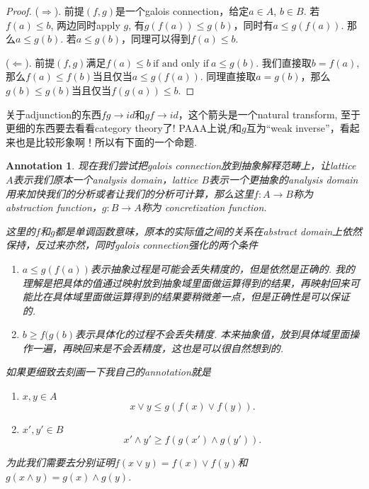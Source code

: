 \documentclass{article}
\newtheorem{annotation}[theorem]{Annotation}
\newcommand*{\xfunc}[4]{{#2}\colon{#3}{#1}{#4}}
\newcommand*{\func}[3]{\xfunc{\to}{#1}{#2}{#3}}
\begin{document}
\begin{center}
\end{center}

\begin{proof}
($\Rightarrow$). 前提$(f,g)$是一个galois connection，给定$a \in A$, $b \in B$. 若$f(a) \leq b$, 两边同时apply $g$, 有$g(f(a)) \leq g(b)$，同时有$a \leq g(f(a))$. 那么$a \leq g(b)$. 若$a \leq g(b)$，同理可以得到$f(a) \leq b$.

($\Leftarrow$). 前提$(f,g)$满足$f(a) \leq b~\text{if and only if}~a \leq g(b)$. 我们直接取$b = f(a)$, 那么$f(a) \leq f(b)$当且仅当$a \leq g(f(a))$. 同理直接取$a = g(b)$，那么$g(b) \leq g(b)$当且仅当$f(g(a)) \leq b $.   
\end{proof}

{\color{blue} 关于adjunction的东西$fg \rightarrow id$和$gf \rightarrow id$，这个箭头是一个natural transform, 至于更细的东西要去看看category theory了! PAAA上说$f$和$g$互为“weak inverse”，看起来也是比较形象啊！所以有下面的一个命题}.

\begin{annotation}
\rm 现在我们尝试把galois connection放到抽象解释范畴上，让lattice $A$表示我们原本一个analysis domain，lattice $B$表示一个更抽象的analysis domain用来加快我们的分析或者让我们的分析可计算，那么这里$\func{f}{A}{B}$称为{\color{red} abstraction function}，$\func{g}{B}{A}$称为{\color{red} concretization function}. 

这里的$f$和$g$都是单调函数意味，原本的实际值之间的关系在abstract domain上依然保持，反过来亦然，同时galois connection强化的两个条件
\begin{enumerate}
	\item $a \leq g(f(a))$表示抽象过程是可能会丢失精度的，但是依然是正确的. {\color{blue} 我的理解是把具体的值通过映射放到抽象域里面做运算得到的结果，再映射回来可能比在具体域里面做运算得到的结果要稍微差一点，但是正确性是可以保证的}.
	\item $b \geq f(g(b)$表示具体化的过程不会丢失精度. {\color{blue} 本来抽象值，放到具体域里面操作一遍，再映回来是不会丢精度，这也是可以很自然想到的}.
\end{enumerate}
如果更细致去刻画一下我自己的annotation就是
\begin{enumerate}
	\item $x,y \in A$
	$$
	x \vee y \leq g(f(x) \vee f(y)).
	$$
	\item $x',y'\in B$
	$$
	x' \wedge y' \geq f(g(x') \wedge g(y')).
	$$
\end{enumerate}
为此我们需要去分别证明$f(x \vee y) = f(x) \vee f(y)$和$g(x \wedge y) = g(x) \wedge g(y)$.
\end{annotation}
\end{document}
